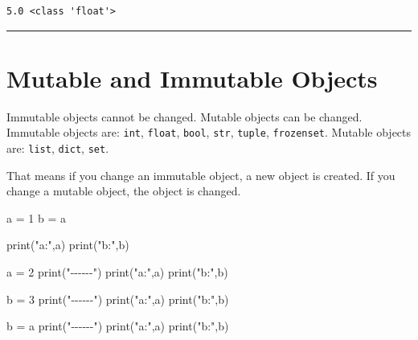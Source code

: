 \documentclass[
  letterpaper,
  DIV=11,
  numbers=noendperiod]{scrreprt}
\newenvironment{Shaded}{\begin{snugshade}}{\end{snugshade}}
\newcommand{\BuiltInTok}[1]{\textcolor[rgb]{0.00,0.23,0.31}{#1}}
\newcommand{\DecValTok}[1]{\textcolor[rgb]{0.68,0.00,0.00}{#1}}
\newcommand{\NormalTok}[1]{\textcolor[rgb]{0.00,0.23,0.31}{#1}}
\newcommand{\OperatorTok}[1]{\textcolor[rgb]{0.37,0.37,0.37}{#1}}
\newcommand{\StringTok}[1]{\textcolor[rgb]{0.13,0.47,0.30}{#1}}
\begin{document}
\begin{verbatim}
5.0 <class 'float'>
\end{verbatim}

\begin{center}\rule{0.5\linewidth}{0.5pt}\end{center}

\chapter*{Mutable and Immutable
Objects}\label{mutable-and-immutable-objects}


Immutable objects cannot be changed. Mutable objects can be changed.
Immutable objects are: \texttt{int}, \texttt{float}, \texttt{bool},
\texttt{str}, \texttt{tuple}, \texttt{frozenset}. Mutable objects are:
\texttt{list}, \texttt{dict}, \texttt{set}.

That means if you change an immutable object, a new object is created.
If you change a mutable object, the object is changed.

\begin{Shaded}
\begin{Highlighting}[]
\NormalTok{a }\OperatorTok{=} \DecValTok{1}
\NormalTok{b }\OperatorTok{=}\NormalTok{ a}

\BuiltInTok{print}\NormalTok{(}\StringTok{"a:"}\NormalTok{,a)}
\BuiltInTok{print}\NormalTok{(}\StringTok{"b:"}\NormalTok{,b)}

\NormalTok{a }\OperatorTok{=} \DecValTok{2}
\BuiltInTok{print}\NormalTok{(}\StringTok{"{-}{-}{-}{-}{-}{-}"}\NormalTok{)}
\BuiltInTok{print}\NormalTok{(}\StringTok{"a:"}\NormalTok{,a)}
\BuiltInTok{print}\NormalTok{(}\StringTok{"b:"}\NormalTok{,b)}

\NormalTok{b }\OperatorTok{=} \DecValTok{3}
\BuiltInTok{print}\NormalTok{(}\StringTok{"{-}{-}{-}{-}{-}{-}"}\NormalTok{)}
\BuiltInTok{print}\NormalTok{(}\StringTok{"a:"}\NormalTok{,a)}
\BuiltInTok{print}\NormalTok{(}\StringTok{"b:"}\NormalTok{,b)}

\NormalTok{b }\OperatorTok{=}\NormalTok{ a}
\BuiltInTok{print}\NormalTok{(}\StringTok{"{-}{-}{-}{-}{-}{-}"}\NormalTok{)}
\BuiltInTok{print}\NormalTok{(}\StringTok{"a:"}\NormalTok{,a)}
\BuiltInTok{print}\NormalTok{(}\StringTok{"b:"}\NormalTok{,b)}
\end{Highlighting}
\end{Shaded}
\end{document}
